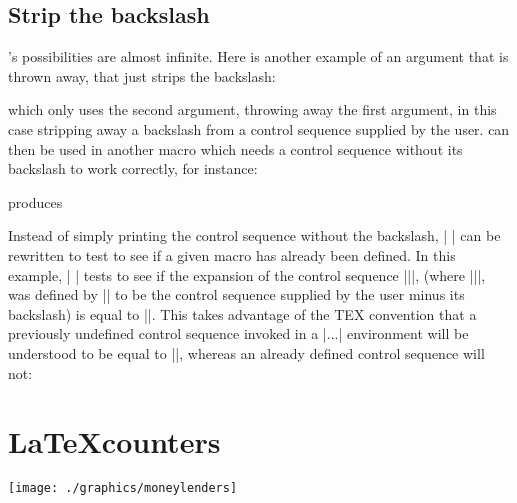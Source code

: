 \section*{Strip the backslash}

\tex's possibilities are almost infinite. Here is another example of
an argument that is thrown away\cite{amy1990}, that just strips the backslash:

\def\stripbackslash#1#2*{\def\one{#2}}

which only uses the second argument, throwing away the
first argument, in this case stripping away a backslash
from a control sequence supplied by the user. 
can then be used in another macro which
needs a control sequence without its backslash to work
correctly, for instance:

\def\newdef#1{\expandafter
\stripbackslash\string#1* \one}

\newdef\testmacro

produces

\newdef\testmacro


Instead of simply printing the control sequence without
the backslash, |\newdef| can be rewritten to test to see
if a given macro has already been defined. In this example,
|\newdef| tests to see if the expansion of the control
sequence |\csname\one\endcsname|, (where |\one|,
was defined by |\stripbackslash| to be the control sequence
supplied by the user minus its backslash) is equal
to |\relax|. This takes advantage of the TEX convention
that a previously undefined control sequence invoked in
a |\csname...\endcsname| environment will be understood
to be equal to |\relax|, whereas an already defined
control sequence will not:


\def\newdef#1{%
  \expandafter\stripbackslash\string#1*
  \expandafter
  \ifx\csname\one\endcsname\relax
  \else %
    {\tt Sorry, \string#1 has already been
     defined. Please supply a new name.}
\fi}


\chapter{\LaTeX counters}
\clearpage

\thispagestyle{plain}
{\centering\texttt{[image: ./graphics/moneylenders]}\par}

